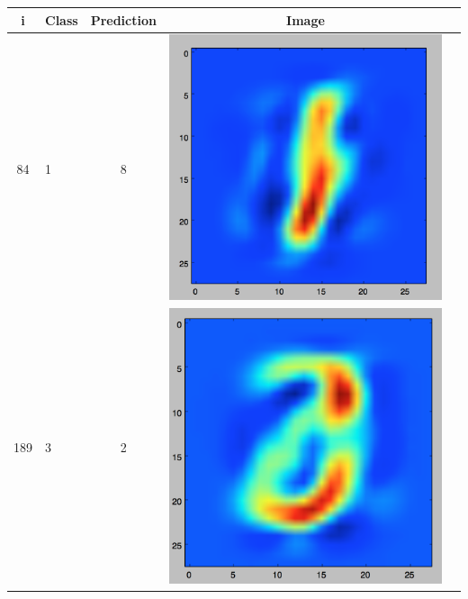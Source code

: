 \documentclass[11pt]{article}
\begin{document}
\begin{table}[!th]
\centering
\begin{tabular}{|clc|c||c|}
\hline
i & Class & Prediction & Image \\
\hline
84 & 1 & 8 & \includegraphics[scale=.2]{images/bayes_1_8.png} \\
\hline
189 & 3 & 2 & \includegraphics[scale=.2]{images/bayes_3_2.png} \\

\end{tabular}
\end{table}
\end{document}
